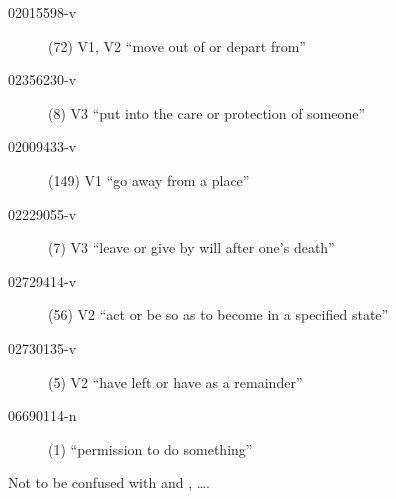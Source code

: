 \documentclass[a4paper,landscape,headrule,footrule,xetex]{foils}
\begin{document}
\begin{description}
\item [02015598-v] (72)
V1, V2 	 ``move out of or depart from''
\item [02356230-v] (8)
V3 	 ``put into the care or protection of someone''
      \item [02009433-v] (149)
V1 	 ``go away from a place''
\item[02229055-v] (7)
V3 	 ``leave or give by will after one's death''
\item [02729414-v] (56) V2 	 ``act or be so as to become in a specified state''
\item [02730135-v] (5) V2  ``have left or have as a remainder''

\item [06690114-n] (1)  ``permission to do something''

\end{description}

Not to be confused with  and , \ldots .

\end{document}
